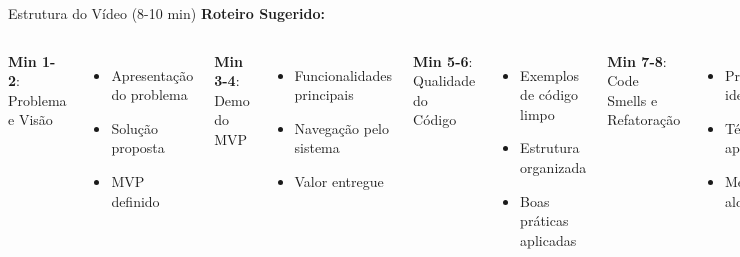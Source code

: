 \documentclass[10pt]{beamer}
\begin{document}
\begin{frame}{Estrutura do Vídeo (8-10 min)}
\textbf{Roteiro Sugerido:}

\begin{columns}[t]
\textbf{Min 1-2}: Problema e Visão
\begin{itemize}
    \item Apresentação do problema
    \item Solução proposta
    \item MVP definido
\end{itemize}

\textbf{Min 3-4}: Demo do MVP
\begin{itemize}
    \item Funcionalidades principais
    \item Navegação pelo sistema
    \item Valor entregue
\end{itemize}

\textbf{Min 5-6}: Qualidade do Código
\begin{itemize}
    \item Exemplos de código limpo
    \item Estrutura organizada
    \item Boas práticas aplicadas
\end{itemize}

\textbf{Min 7-8}: Code Smells e Refatoração
\begin{itemize}
    \item Problemas identificados
    \item Técnicas aplicadas
    \item Melhorias alcançadas
\end{itemize}

\textbf{Min 9-10}: Conclusões
\begin{itemize}
    \item Lições aprendidas
    \item Próximos passos
\end{itemize}
\end{columns}
\end{frame}
\end{document}
